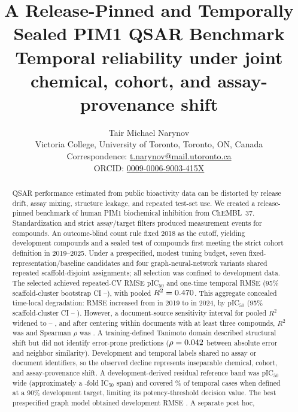 \documentclass[11pt]{article}
\title{\textbf{A Release-Pinned and Temporally Sealed PIM1 QSAR Benchmark}\\[3pt]
\large Temporal reliability under joint chemical, cohort, and assay-provenance shift}
\author{Tair Michael Narynov\\[4pt]
{\normalsize Victoria College, University of Toronto, Toronto, ON, Canada}\\[2pt]
{\normalsize Correspondence: \href{mailto:t.narynov@mail.utoronto.ca}{t.narynov@mail.utoronto.ca}}\\[2pt]
{\normalsize ORCID: \href{https://orcid.org/0009-0006-9003-415X}{0009-0006-9003-415X}}}
\date{}
\begin{document}
\maketitle

\begin{abstract}
QSAR performance estimated from public bioactivity data can be distorted by
release drift, assay mixing, structure leakage, and repeated test-set use. We
created a release-pinned benchmark of human PIM1 biochemical inhibition from
ChEMBL~37. Standardization and strict assay/target filters produced
\StrictEventCount{} measurement events for \StrictCompoundCount{} compounds. An
outcome-blind count rule fixed 2018 as the cutoff, yielding \DevelopmentCount{}
development compounds and a sealed test of \TemporalCount{} compounds first
meeting the strict cohort definition in 2019--2025. Under a prespecified, modest
tuning budget, seven
fixed-representation/baseline candidates and four graph-neural-network variants
shared repeated scaffold-disjoint assignments; all selection was confined to
development data. The selected \SelectedModelText{} achieved repeated-CV RMSE
\DevelopmentRMSE{} pIC$_{50}$ and one-time temporal RMSE \TemporalRMSE{} (95\%
scaffold-cluster bootstrap CI \TemporalRMSELower{}--\TemporalRMSEUpper{}), with
pooled $R^2=0.470{}$. This aggregate concealed time-local degradation:
RMSE increased from \TemporalRMSETwentyNineteen{} in 2019 to
\TemporalRMSETwentyTwentyFour{} in 2024, by \TemporalRMSEIncrease{} pIC$_{50}$
(95\% scaffold-cluster CI \TemporalRMSEIncreaseScaffoldLower{}--
\TemporalRMSEIncreaseScaffoldUpper{}). However, a document-source sensitivity
interval for pooled $R^2$ widened to \DocumentClusterRtwoLower{}--
\DocumentClusterRtwoUpper{}, and after centering within documents with at least
three compounds, $R^2$ was \DocumentCenteredRtwo{} and Spearman $\rho$ was
\DocumentCenteredSpearman{}. A training-defined Tanimoto domain described structural shift
but did not identify error-prone predictions ($\rho=0.042{}$ between
absolute error and neighbor similarity). Development and temporal labels shared
no assay or document identifiers, so the observed decline represents inseparable
chemical, cohort, and assay-provenance shift. A development-derived residual
reference band was \IntervalWidth{} pIC$_{50}$ wide (approximately a
\IntervalFoldSpan{}-fold IC$_{50}$ span) and covered
\TemporalCoveragePercent{}\% of temporal cases when defined at a 90\% development
target, limiting its potency-threshold decision value. The best prespecified
graph model obtained development RMSE \BestGraphRMSE{}. A separate post hoc,

\end{abstract}
\end{document}

